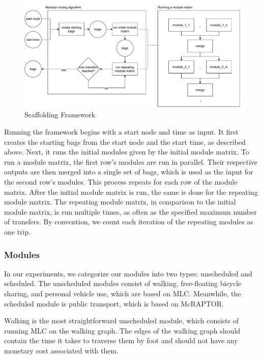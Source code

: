 \begin{figure}[h]
    \centering
    \includegraphics[scale=0.50]{Figures/method/modular_routing_algorithm}
    \caption{Scaffolding Framework}
    \label{fig:modular_routing_algorithm}
\end{figure}

Running the framework begins with a start node and time as input.
It first creates the starting bags from the start node and the start time, as described above.
Next, it runs the initial modules given by the initial module matrix.
To run a module matrix, the first row's modules are run in parallel.
Their respective outputs are then merged into a single set of bags, which is used as the input for the second row's modules.
This process repeats for each row of the module matrix.
After the initial module matrix is run, the same is done for the repeating module matrix.
The repeating module matrix, in comparison to the initial module matrix, is run multiple times, as often as the specified maximum number of transfers.
By convention, we count each iteration of the repeating modules as one trip.

\subsubsection{Modules}
\label{subsubsec:modules}

In our experiments, we categorize our modules into two types: unscheduled and scheduled. 
The unscheduled modules consist of walking, free-floating bicycle sharing, and personal vehicle use, which are based on MLC. Meanwhile, the scheduled module is public transport, which is based on McRAPTOR.

Walking is the most straightforward unscheduled module, which consists of running MLC on the walking graph.
The edges of the walking graph should contain the time it takes to traverse them by foot and should not have any monetary cost associated with them.

